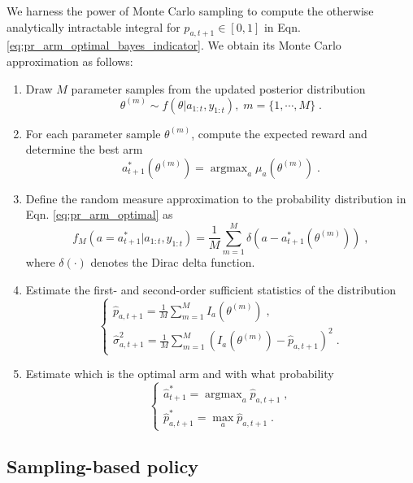 \documentclass{article}
\newcommand{\argmax}{\mathop{\mathrm{argmax}}}
\begin{document}
We harness the power of Monte Carlo sampling to compute the otherwise analytically intractable integral for $p_{a,t+1}\in [0,1]$ in Eqn. \ref{eq:pr_arm_optimal_bayes_indicator}. We obtain its Monte Carlo approximation as follows:
\begin{enumerate}
	\item Draw $M$ parameter samples from the updated posterior distribution
	\begin{equation}
	\theta^{(m)}\sim f(\theta|a_{1:t}, y_{1:t}), \; m=\{1, \cdots, M\} \; .
	\end{equation}
	\item For each parameter sample $\theta^{(m)}$, compute the expected reward and determine the best arm 
	\begin{equation}
	a_{t+1}^*(\theta^{(m)})=\argmax_{a}\mu_{a}(\theta^{(m)}) \; .
	\end{equation}
	\item Define the random measure approximation to the probability distribution in Eqn. \ref{eq:pr_arm_optimal} as
	\begin{equation}
	f_M(a =a_{t+1}^*|a_{1:t}, y_{1:t}) = \frac{1}{M} \sum_{m=1}^M \delta\left(a - a_{t+1}^*(\theta^{(m)}) \right) \; ,
	\label{eq:pr_arm_optimal_bayes_MC}
	\end{equation}
	where $\delta(\cdot)$ denotes the Dirac delta function.
	\item Estimate the first- and second-order sufficient statistics of the distribution
	\begin{equation}
	\begin{cases}
	\hat{p}_{a,t+1}=\frac{1}{M}\sum_{m=1}^M I_a\left(\theta^{(m)}\right) \; , \\
	\hat{\sigma}^2_{a,t+1}=\frac{1}{M} \sum_{m=1}^M \left(I_a\left(\theta^{(m)}\right)- \hat{p}_{a,t+1} \right)^2 \; .
	\end{cases}
	\label{eq:pr_arm_optimal_bayes_MC_suff_statistics}
	\end{equation}
	\item Estimate which is the optimal arm and with what probability
	\begin{equation}
	\begin{cases}
	\hat{a}_{t+1}^* =\argmax_{a} \hat{p}_{a,t+1} \; ,  \\
	\hat{p}^*_{a,t+1}=\max_{a} \hat{p}_{a,t+1} \; .
	\end{cases}
	\end{equation}
\end{enumerate}

\subsection{Sampling-based policy}
\label{ssec:sampling_policy}
\end{document}
